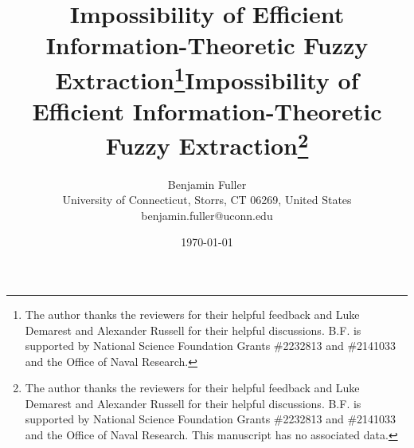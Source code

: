 \documentclass[11pt]{article}
\title{Impossibility of Efficient Information-Theoretic Fuzzy Extraction\footnote{The author thanks the reviewers for their helpful feedback and Luke Demarest and Alexander Russell for their helpful discussions. B.F. is supported by National Science Foundation Grants \#2232813 and \#2141033 and the Office of Naval Research. 
}}
\author{Benjamin Fuller\\University of Connecticut, Storrs, CT 06269, United States\\benjamin.fuller@uconn.edu}
\date{\today}
\theoremstyle{thmstyleone}
\theoremstyle{thmstyletwo}%
\theoremstyle{thmstylethree}%
\begin{document}
  \ifnum{}
  \maketitle
    
  \else
  \title[Impossibility of Efficient Information-Theoretic Fuzzy Extraction]{Impossibility of Efficient Information-Theoretic Fuzzy Extraction\footnote{The author thanks the reviewers for their helpful feedback and Luke Demarest and Alexander Russell for their helpful discussions. B.F. is supported by National Science Foundation Grants \#2232813 and \#2141033 and the Office of Naval Research. This manuscript has no associated data.
}}
\author[1]{ }
  
\maketitle
\fi

  
  
  
  
  \ifnum{}
  
\fi

  
\end{document}
